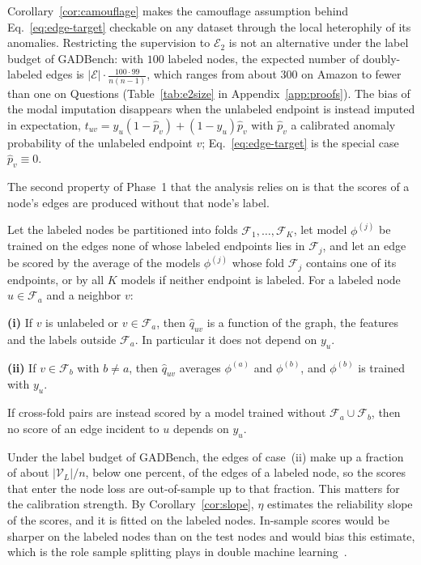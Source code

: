 Corollary~\ref{cor:camouflage} makes the camouflage assumption behind Eq.~\eqref{eq:edge-target} checkable on any dataset through the local heterophily of its anomalies.
Restricting the supervision to $\mathcal E_2$ is not an alternative under the label budget of GADBench: with $100$ labeled nodes, the expected number of doubly-labeled edges is $|\mathcal E|\cdot\tfrac{100\cdot99}{n(n-1)}$, which ranges from about $300$ on Amazon to fewer than one on Questions (Table~\ref{tab:e2size} in Appendix~\ref{app:proofs}).
The bias of the modal imputation disappears when the unlabeled endpoint is instead imputed in expectation, $t_{uv}=y_u(1-\hat p_v)+(1-y_u)\hat p_v$ with $\hat p_v$ a calibrated anomaly probability of the unlabeled endpoint $v$; Eq.~\eqref{eq:edge-target} is the special case $\hat p_v\equiv0$.

The second property of Phase~1 that the analysis relies on is that the scores of a node's edges are produced without that node's label.

\begin{proposition}\label{prop:crossfit}
Let the labeled nodes be partitioned into folds $\mathcal F_1,\dots,\mathcal F_K$, let model $\phi^{(j)}$ be trained on the edges none of whose labeled endpoints lies in $\mathcal F_j$, and let an edge be scored by the average of the models $\phi^{(j)}$ whose fold $\mathcal F_j$ contains one of its endpoints, or by all $K$ models if neither endpoint is labeled.
For a labeled node $u\in\mathcal F_a$ and a neighbor $v$:

\smallskip\noindent\textbf{(i)} If $v$ is unlabeled or $v\in\mathcal F_a$, then $\hat q_{uv}$ is a function of the graph, the features and the labels outside $\mathcal F_a$. In particular it does not depend on $y_u$.

\smallskip\noindent\textbf{(ii)} If $v\in\mathcal F_b$ with $b\neq a$, then $\hat q_{uv}$ averages $\phi^{(a)}$ and $\phi^{(b)}$, and $\phi^{(b)}$ is trained with $y_u$.

\smallskip\noindent If cross-fold pairs are instead scored by a model trained without $\mathcal F_a\cup\mathcal F_b$, then no score of an edge incident to $u$ depends on $y_u$.
\end{proposition}

Under the label budget of GADBench, the edges of case~(ii) make up a fraction of about $|\mathcal V_L|/n$, below one percent, of the edges of a labeled node, so the scores that enter the node loss are out-of-sample up to that fraction.
This matters for the calibration strength.
By Corollary~\ref{cor:slope}, $\eta$ estimates the reliability slope of the scores, and it is fitted on the labeled nodes.
In-sample scores would be sharper on the labeled nodes than on the test nodes and would bias this estimate, which is the role sample splitting plays in double machine learning~\citep{DML}.

